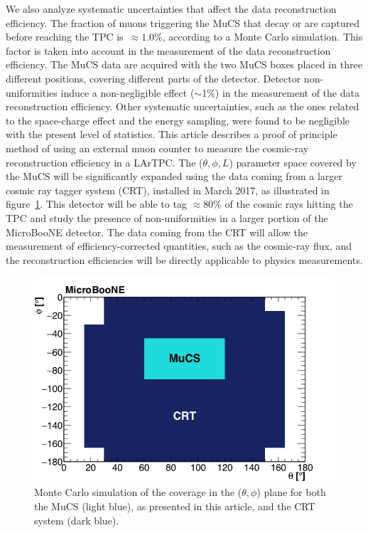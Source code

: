 \documentclass[a4paper,11pt]{article}
\begin{document}
We also analyze systematic uncertainties that affect the data reconstruction efficiency. The fraction of muons triggering the MuCS that decay or are captured before reaching the TPC is~$\approx1.0\%$, according to a Monte Carlo simulation.  This factor is taken into account in the measurement of the data reconstruction efficiency.
The MuCS data are acquired with the two MuCS boxes placed in three different positions, covering different parts of the detector. Detector non-uniformities induce a non-negligible effect ($\sim$1\%) in the measurement of the data reconstruction efficiency. Other systematic uncertainties, such as the ones related to the space-charge effect and the energy sampling, were found to be negligible with the present level of statistics.
This article describes a proof of principle method of using an external muon counter to measure the cosmic-ray reconstruction efficiency in a LArTPC. The ($\theta, \phi, L$) parameter space covered by the MuCS will be significantly expanded using the data coming from a larger cosmic ray tagger system (CRT), installed in March 2017, as illustrated in figure~\ref{fig:crt}. This detector will be able to tag $\approx$80\% of the cosmic rays hitting the TPC and study the presence of non-uniformities in a larger portion of the MicroBooNE detector. The data coming from the CRT will allow the measurement of efficiency-corrected quantities, such as the cosmic-ray flux, and the reconstruction efficiencies will be directly applicable to physics measurements.

\begin{figure}[htbp]
  \begin{center}
    \includegraphics[width=0.7\linewidth]{figures/crt.png}
    \caption{Monte Carlo simulation of the coverage in the ($\theta,\phi$) plane for both the MuCS (light blue), as presented in this article, and the CRT system (dark blue).} \label{fig:crt}
  \end{center}
\end{figure}
\end{document}

